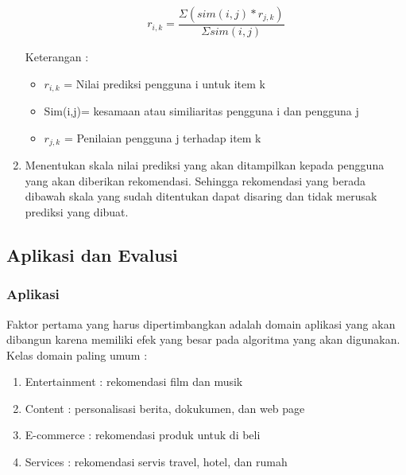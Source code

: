 \begin{enumerate}

	\begin{equation}
		r_{i,k} = \frac{\Sigma (sim(i,j)*r_{j,k}) }{\Sigma sim(i,j)}
	\end{equation}		
		
	Keterangan :
	\begin{itemize}
		\item $r_{i,k}$ = Nilai prediksi pengguna i untuk item k
		
		\item Sim(i,j)= kesamaan atau similiaritas pengguna i dan pengguna j
		
		\item $r_{j,k} $ = Penilaian pengguna j terhadap item k
		
		
		
	\end{itemize}\leavevmode
	
	\item Menentukan skala nilai prediksi yang akan ditampilkan kepada pengguna yang akan diberikan rekomendasi. Sehingga rekomendasi yang berada dibawah skala yang sudah ditentukan dapat disaring dan tidak merusak prediksi yang dibuat. %
	 
\end{enumerate}\leavevmode



\subsection{Aplikasi dan Evalusi}
\label{sec:aplikasi dan evaluasi}
\subsubsection{Aplikasi}
Faktor pertama yang harus dipertimbangkan adalah domain aplikasi yang akan dibangun karena memiliki efek yang besar pada algoritma yang akan digunakan. Kelas domain paling umum : %
\begin{enumerate}
	\item Entertainment : rekomendasi film dan musik
	\item Content : personalisasi berita, dokukumen, dan web page
	\item E-commerce : rekomendasi produk untuk di beli
	\item Services : rekomendasi servis travel, hotel, dan rumah
\end{enumerate}

